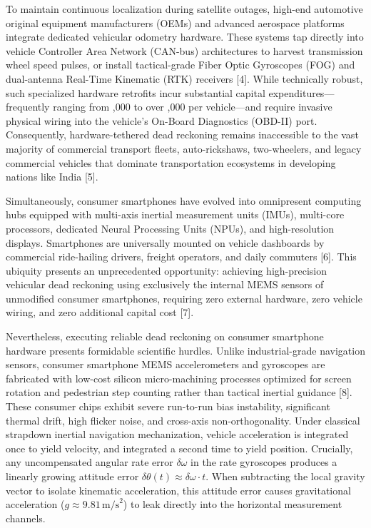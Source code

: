 \documentclass[11pt,a4paper]{article}
\begin{document}
To maintain continuous localization during satellite outages, high-end automotive original equipment manufacturers (OEMs) and advanced aerospace platforms integrate dedicated vehicular odometry hardware. These systems tap directly into vehicle Controller Area Network (CAN-bus) architectures to harvest transmission wheel speed pulses, or install tactical-grade Fiber Optic Gyroscopes (FOG) and dual-antenna Real-Time Kinematic (RTK) receivers [4]. While technically robust, such specialized hardware retrofits incur substantial capital expenditures—frequently ranging from ,000 to over ,000 per vehicle—and require invasive physical wiring into the vehicle's On-Board Diagnostics (OBD-II) port. Consequently, hardware-tethered dead reckoning remains inaccessible to the vast majority of commercial transport fleets, auto-rickshaws, two-wheelers, and legacy commercial vehicles that dominate transportation ecosystems in developing nations like India [5].

Simultaneously, consumer smartphones have evolved into omnipresent computing hubs equipped with multi-axis inertial measurement units (IMUs), multi-core processors, dedicated Neural Processing Units (NPUs), and high-resolution displays. Smartphones are universally mounted on vehicle dashboards by commercial ride-hailing drivers, freight operators, and daily commuters [6]. This ubiquity presents an unprecedented opportunity: achieving high-precision vehicular dead reckoning using exclusively the internal MEMS sensors of unmodified consumer smartphones, requiring zero external hardware, zero vehicle wiring, and zero additional capital cost [7].

Nevertheless, executing reliable dead reckoning on consumer smartphone hardware presents formidable scientific hurdles. Unlike industrial-grade navigation sensors, consumer smartphone MEMS accelerometers and gyroscopes are fabricated with low-cost silicon micro-machining processes optimized for screen rotation and pedestrian step counting rather than tactical inertial guidance [8]. These consumer chips exhibit severe run-to-run bias instability, significant thermal drift, high flicker noise, and cross-axis non-orthogonality. Under classical strapdown inertial navigation mechanization, vehicle acceleration is integrated once to yield velocity, and integrated a second time to yield position. Crucially, any uncompensated angular rate error $\delta\omega$ in the rate gyroscopes produces a linearly growing attitude error $\delta\theta(t) \approx \delta\omega \cdot t$. When subtracting the local gravity vector to isolate kinematic acceleration, this attitude error causes gravitational acceleration ($g \approx 9.81\,\text{m/s}^2$) to leak directly into the horizontal measurement channels.
\end{document}
